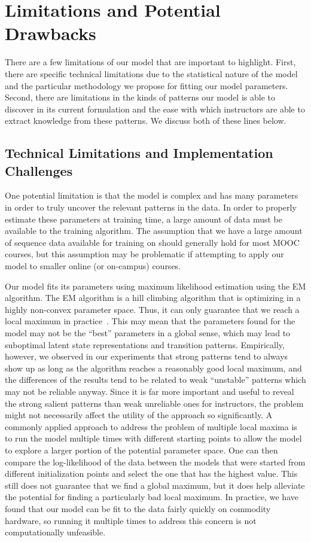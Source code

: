 \section{Limitations and Potential Drawbacks}

There are a few limitations of our model that are important to highlight.
First, there are specific technical limitations due to the statistical
nature of the model and the particular methodology we propose for fitting
our model parameters. Second, there are limitations in the kinds of
patterns our model is able to discover in its current formulation and the
ease with which instructors are able to extract knowledge from these
patterns. We discuss both of these lines below.

\subsection{Technical Limitations and Implementation Challenges}

One potential limitation is that the model is complex and has many parameters
in order to truly uncover the relevant patterns in the data. In order to
properly estimate these parameters at training time, a large amount of data
must be available to the training algorithm. The assumption that we have a
large amount of sequence data available for training on should generally
hold for most MOOC courses, but this assumption may be problematic if
attempting to apply our model to smaller online (or on-campus) courses.

Our model fits its parameters using maximum likelihood estimation using the
EM algorithm. The EM algorithm is a hill climbing algorithm that is
optimizing in a highly non-convex parameter space. Thus, it can only
guarantee that we reach a local maximum in
practice~\citep{Dempster:1977:JRSS}.  This may mean that the parameters
found for the model may not be the ``best'' parameters in a global sense,
which may lead to suboptimal latent state representations and transition
patterns. Empirically, however, we observed in our experiments that strong
patterns tend to always show up as long as the algorithm reaches a
reasonably good local maximum, and the differences of the results tend to
be related to weak ``unstable'' patterns which may not be reliable anyway.
Since it is far more important and useful to reveal the strong salient
patterns than weak unreliable ones for instructors, the problem might not
necessarily affect the utility of the approach so significantly.  A
commonly applied approach to address the problem of multiple local maxima
is to run the model multiple times with different starting points to allow
the model to explore a larger portion of the potential parameter space. One
can then compare the log-likelihood of the data between the models that
were started from different initialization points and select the one that
has the highest value. This still does not guarantee that we find a global
maximum, but it does help alleviate the potential for finding a
particularly bad local maximum.  In practice, we have found that our model
can be fit to the data fairly quickly on commodity hardware, so running it
multiple times to address this concern is not computationally unfeasible.

